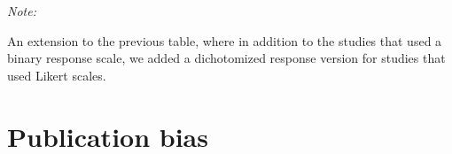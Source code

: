 \documentclass[
  doc,floatsintext]{apa6}
\begin{document}
\begin{table}
\centering\centering
\caption{\label{tab:meta-odds-extended}Individual-level studies with binary response scales and Likert scale ratings collapsed to binary responses}
\centering
\begin{threeparttable}
\begin{tablenotes}
\item \textit{Note: } 
\item An extension to the previous table, where in addition to the studies that used a binary response scale, we added a dichotomized response version for studies that used Likert scales.
\end{tablenotes}
\end{threeparttable}
\end{table}

\clearpage

\section{Publication bias}\label{publication-bias}

\FloatBarrier
\end{document}
